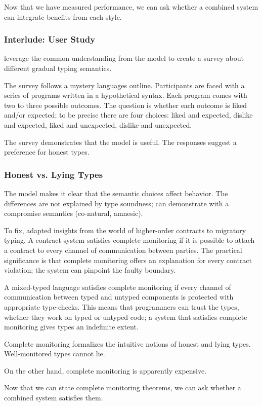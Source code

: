 Now that we have measured performance, we can ask whether a combined system
 can integrate benefits from each style.


\subsubsection{Interlude: User Study}

\citet{tgpk-dls-2018} leverage the common understanding from the model
 to create a survey about different gradual typing semantics.

The survey follows a mystery languages outline.
Participants are faced with a series of programs written in a hypothetical
 syntax.
Each program comes with two to three possible outcomes.
The question is whether each outcome is liked and/or expected; to be precise
 there are four choices: liked and expected, dislike and expected,
 liked and unexpected, dislike and unexpected.

The survey demonstrates that the model is useful.
The responses suggest a preference for honest types.



\subsubsection{Honest vs. Lying Types}

The model makes it clear that the semantic choices affect behavior.
The differences are not explained by type soundness; can demonstrate
 with a compromise semantics (co-natural, amnesic).


To fix, adapted insights from the world of higher-order contracts to migratory
 typing.
A contract system satisfies complete monitoring if it is possible to attach
 a contract to every channel of communication between parties.
The practical significance is that complete monitoring offers an explanation
 for every contract violation; the system can pinpoint the faulty boundary.

A mixed-typed language satisfies complete monitoring if every channel of
 communication between typed and untyped components is protected with
 appropriate type-checks.
This means that programmers can trust the types,
 whether they work on typed or untyped code;
 a system that satisfies complete monitoring gives types an indefinite extent.

Complete monitoring formalizes the intuitive notions of honest and lying types.
Well-monitored types cannot lie.

On the other hand, complete monitoring is apparently expensive.

Now that we can state complete monitoring theorems, we can ask whether a combined
system satisfies them.

